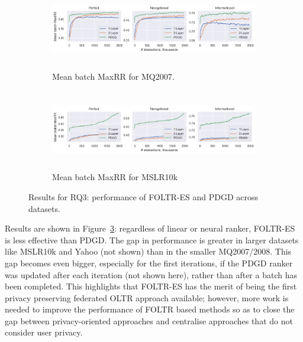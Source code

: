 \begin{figure}[t]
	\centering
	\begin{subfigure}{1\textwidth}
		\includegraphics[width=15cm, height=3.5cm]{images/RQ3n4/mq2007_foltr_PDGD_mrr_c2000_p1.0}
		\caption{Mean batch MaxRR for MQ2007.}
		\label{fig:mq2007-rq3}
	\end{subfigure}
	\begin{subfigure}{1\textwidth}
		\includegraphics[width=15cm, height=3.5cm]{images/RQ3n4/mslr10k_foltr_PDGD_mrr_c2000_p1.0.png}
		\caption{Mean batch MaxRR for MSLR10k}
		\label{fig:mslr10k-rq3}
	\end{subfigure}
	\caption{Results for RQ3: performance of FOLTR-ES and PDGD across datasets. \label{fig:RQ3}} 
\end{figure}

Results are shown in Figure~\ref{fig:RQ3}: regardless of linear or neural ranker, FOLTR-ES is less effective than PDGD. The gap in performance is greater in larger datasets like MSLR10k and Yahoo (not shown) than in the smaller MQ2007/2008. This gap becomes even bigger, especially for the first iterations, if the PDGD ranker was updated after each iteration (not shown here), rather than after a batch has been completed. This highlights that FOLTR-ES has the merit of being the first privacy preserving federated OLTR approach available; however, more work is needed to improve the performance of FOLTR based methods so as to close the gap between privacy-oriented approaches and centralise approaches that do not consider user privacy.


